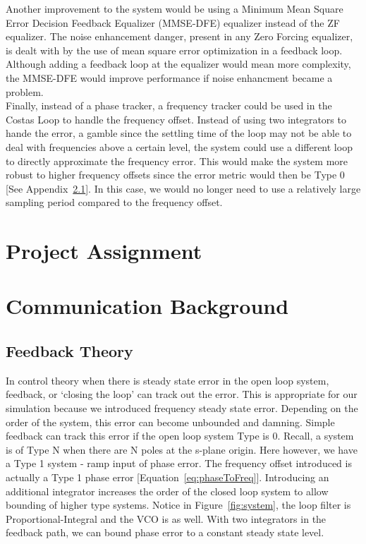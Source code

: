 \documentclass[]{article}
\begin{document}
Another improvement to the system would be using a Minimum Mean Square Error Decision Feedback Equalizer (MMSE-DFE) equalizer instead of the ZF equalizer.  The noise enhancement danger, present in any Zero Forcing equalizer, is  dealt with by the use of mean square error optimization in a feedback loop.  Although adding a feedback loop at the equalizer would mean more complexity, the MMSE-DFE would improve performance if noise enhancment became a problem.  \\

Finally, instead of a phase tracker, a frequency tracker could be used in the Costas Loop to handle the frequency offset.  Instead of using two integrators to hande the error, a gamble since the settling time of the loop may not be able to deal with frequencies above a certain level, the system could use a different loop to directly approximate the frequency error.  This would make the system more robust to higher frequency offsets since the error metric would then be Type 0 [See Appendix~\ref{app:feedback}].  In this case, we would no longer need to use a relatively large sampling period compared to the frequency offset.  


\appendix
\newpage


\newpage
\section{Project Assignment}
\label{app:assign}

\cleardoublepage
\newpage

\section{Communication Background}
\subsection{Feedback Theory}
\label{app:feedback}
In control theory when there is steady state error in the open loop system, feedback, or `closing the loop' can track out the error. This is appropriate for our simulation because we introduced frequency steady state error.  Depending on the order of the system, this error can become unbounded and damning.  Simple feedback can track this error if the open loop system Type is 0.  Recall, a system is of Type N when there are N poles at the s-plane origin.  Here however, we have a Type 1 system - ramp input of phase error.  The frequency offset introduced is actually a Type 1 phase error [Equation~\ref{eq:phaseToFreq}].  Introducing an additional integrator increases the order of the closed loop system to allow bounding of higher type systems. Notice in Figure~\ref{fig:system}, the loop filter is Proportional-Integral and the VCO is as well. With two integrators in the feedback path, we can bound phase error to a constant steady state level.  \\
\end{document}
